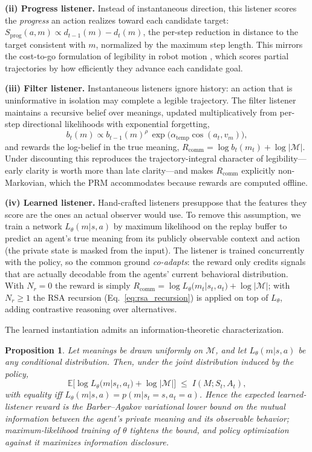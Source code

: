 \documentclass{article}
\newtheorem{proposition}{Proposition}
\newcommand{\Rcomm}{R_{\text{comm}}}
\newcommand{\Ltheta}{L_\theta}
\begin{document}
\textbf{(ii) Progress listener.} Instead of instantaneous direction, this listener scores the \emph{progress} an action realizes toward each candidate target: $S_{\text{prog}}(a,m) \propto d_{t-1}(m) - d_t(m)$, the per-step reduction in distance to the target consistent with $m$, normalized by the maximum step length. This mirrors the cost-to-go formulation of legibility in robot motion \cite{dragan2013legibility}, which scores partial trajectories by how efficiently they advance each candidate goal.

\textbf{(iii) Filter listener.} Instantaneous listeners ignore history: an action that is uninformative in isolation may complete a legible trajectory. The filter listener maintains a recursive belief over meanings, updated multiplicatively from per-step directional likelihoods with exponential forgetting,
\begin{equation}
b_t(m) \propto b_{t-1}(m)^{\rho}\, \exp\!\big(\alpha_{\text{temp}} \cos(a_t, v_m)\big), \label{eq:filter}
\end{equation}
and rewards the log-belief in the true meaning, $\Rcomm = \log b_t(m_t) + \log|\mathcal{M}|$. Under discounting this reproduces the trajectory-integral character of legibility---early clarity is worth more than late clarity---and makes $\Rcomm$ explicitly non-Markovian, which the PRM accommodates because rewards are computed offline.

\textbf{(iv) Learned listener.} Hand-crafted listeners presuppose that the features they score are the ones an actual observer would use. To remove this assumption, we train a network $\Ltheta(m|s,a)$ by maximum likelihood on the replay buffer to predict an agent's true meaning from its publicly observable context and action (the private state is masked from the input). The listener is trained concurrently with the policy, so the common ground \emph{co-adapts}: the reward only credits signals that are actually decodable from the agents' current behavioral distribution. With $N_r=0$ the reward is simply $\Rcomm = \log \Ltheta(m_t|s_t,a_t) + \log|\mathcal{M}|$; with $N_r\geq 1$ the RSA recursion (Eq.~\ref{eq:rsa_recursion}) is applied on top of $\Ltheta$, adding contrastive reasoning over alternatives.

The learned instantiation admits an information-theoretic characterization.

\begin{proposition}
\label{prop:mi}
Let meanings be drawn uniformly on $\mathcal{M}$, and let $\Ltheta(m|s,a)$ be any conditional distribution. Then, under the joint distribution induced by the policy,
\begin{equation}
\mathbb{E}\big[\log \Ltheta(m|s_t,a_t) + \log|\mathcal{M}|\big] \;\leq\; I(M; S_t, A_t),
\end{equation}
with equality iff $\Ltheta(m|s,a) = p(m|s_t=s, a_t=a)$. Hence the expected learned-listener reward is the Barber--Agakov variational lower bound \cite{barber2003im} on the mutual information between the agent's private meaning and its observable behavior; maximum-likelihood training of $\theta$ tightens the bound, and policy optimization against it maximizes information disclosure.
\end{proposition}
\end{document}
